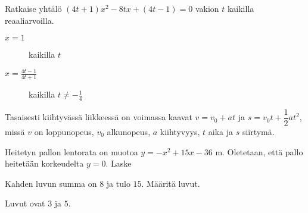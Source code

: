 \begin{tehtavasivu}
\begin{tehtava}
Ratkaise yhtälö $(4t+1)x^2-8tx+(4t-1)=0$ vakion $t$ kaikilla reaaliarvoilla.
	\begin{vastaus}
		\begin{description}
			\item[$x=1$] kaikilla $t$
			\item[$x=\frac{4t-1}{4t+1}$] kaikilla $t \neq -\frac{1}{4}$
		\end{description}
    \end{vastaus}
\end{tehtava}

\begin{tehtava}
    Tasaisesti kiihtyvässä liikkeessä on voimassa kaavat $v = v_0 + at$ ja $s = v_0t + \dfrac{1}{2}at^2$, missä $v$ on loppunopeus, $v_0$ alkunopeus, $a$ kiihtyvyys, $t$ aika ja $s$ siirtymä.
		\begin{alakohdat}
        \end{alakohdat}
    \begin{vastaus}
        \begin{alakohdat}
        \end{alakohdat}
    \end{vastaus}
\end{tehtava}

\begin{tehtava}
	Heitetyn pallon lentorata on muotoa $y=-x^2+15x-36$ m. Oletetaan, että pallo heitetään korkeudelta $y=0$. Laske
		\begin{alakohdat}
		\end{alakohdat}
	\begin{vastaus}
		\begin{alakohdat}
			\alakohta{9 m}
			\alakohta{3 m}
			\alakohta{12 m}
		\end{alakohdat}
	\end{vastaus}
\end{tehtava}

\begin{tehtava}
    Kahden luvun summa on $8$ ja tulo $15$. Määritä luvut.
    \begin{vastaus}
		Luvut ovat $3$ ja $5$.
    \end{vastaus}
\end{tehtava}


\end{tehtavasivu}

